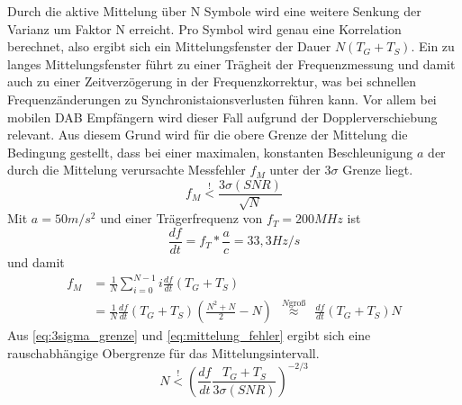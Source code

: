 Durch die aktive Mittelung über N Symbole wird eine weitere Senkung der Varianz um Faktor N erreicht. Pro Symbol wird genau eine Korrelation berechnet, also ergibt sich ein Mittelungsfenster der Dauer $N (T_G + T_S)$. Ein zu langes Mittelungsfenster führt zu einer Trägheit der Frequenzmessung und damit auch zu einer Zeitverzögerung in der Frequenzkorrektur, was bei schnellen Frequenzänderungen zu Synchronistaionsverlusten führen kann. Vor allem bei mobilen \ac{DAB} Empfängern wird dieser Fall aufgrund der Dopplerverschiebung relevant. Aus diesem Grund wird für die obere Grenze der Mittelung die Bedingung gestellt, dass bei einer maximalen, konstanten Beschleunigung $a$ der durch die Mittelung verursachte Messfehler $f_M$ unter der $3\sigma$ Grenze liegt.
\begin{equation}
f_M \overset{!}{<} \frac{3\sigma(SNR)}{\sqrt{N}}
\label{eq:3sigma_grenze}
\end{equation}
Mit $a=50m/s^2$ und einer Trägerfrequenz von $f_T = 200 MHz$ ist
\begin{equation}
\frac{df}{dt} = f_T * \frac{a}{c} = 33,3 Hz/s
\end{equation}
und damit
\begin{equation}
\begin{aligned}
f_M &= \frac{1}{N} \sum \limits_{i=0}^{N-1} i \frac{df}{dt} (T_G+T_S) \\
&= \frac{1}{N} \frac{df}{dt} (T_G+T_S) \left(\frac{N^2 + N}{2} - N\right) \ \ {\overset{N\text{groß}}{\approx}} \ \  \frac{df}{dt} (T_G+T_S) N
\end{aligned}
\label{eq:mittelung_fehler}
\end{equation}
Aus \ref{eq:3sigma_grenze} und \ref{eq:mittelung_fehler} ergibt sich eine rauschabhängige Obergrenze für das Mittelungsintervall.
\begin{equation}
N \overset{!}{<} \left(\frac{df}{dt}\frac{T_G + T_S}{3 \sigma(SNR)}\right)^{-2/3}
\end{equation}
